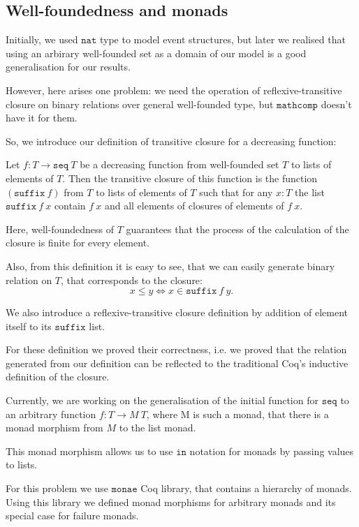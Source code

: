 \subsection{Well-foundedness and monads}

Initially, we used $\mathtt{nat}$ type to model event structures,
but later we realised that using an arbirary well-founded set as a 
domain of our model is a good generalisation for our results. 

However, here arises one problem: we need the operation of 
reflexive-transitive closure on binary relations over 
general well-founded type, but $\mathtt{mathcomp}$ doesn't
have it for them.

So, we introduce our definition of transitive closure for a 
decreasing function:

\begin{definition}
  Let $f : T \to \mathtt{seq} \ T$ be a decreasing function from 
  well-founded set $T$ to lists of elements of $T$. Then the 
  transitive closure of this function is the function 
  $(\mathtt{suffix} \ f)$ from $T$ to lists of elements 
  of $T$ such that for any $x : T$ the list $\mathtt{suffix} \ f \ x$
  contain $f \ x$ and all elements of closures of elements of $f \ x$.
\end{definition}

Here, well-foundedness of $T$ guarantees that the process of the 
calculation of the closure is finite for every element.

Also, from this definition it is easy to see, that we can easily 
generate binary relation on $T$, that corresponds to the closure:
$$x \leq y \Leftrightarrow x \in \mathtt{suffix} \ f \ y.$$

We also introduce a reflexive-transitive closure definition by 
addition of element itself to its $\mathtt{suffix}$ list.

For these definition we proved their correctness, i.e. we proved
that the relation generated from our definition can be reflected 
to the traditional Coq's inductive definition of the closure.

Currently, we are working on the generalisation of the initial 
function for $\mathtt{seq}$ to an arbitrary function 
$f : T \to M \ T$, where M is such a monad, that there is a monad 
morphism from $M$ to the list monad.

This monad morphism allows us to use $\texttt{in}$ notation for
monads by passing values to lists.

For this problem we use $\mathtt{monae}$ Coq library, that 
contains a hierarchy of monads. Using this library we defined
monad morphisms for arbitrary monads and its special case for 
failure monads.
